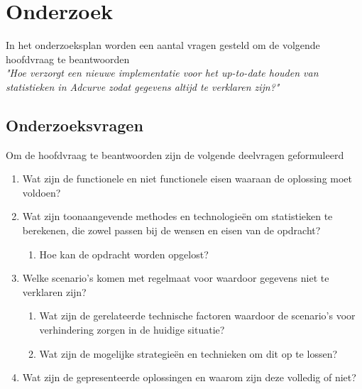 \chapter{Onderzoek}

In het onderzoeksplan worden een aantal vragen gesteld om de volgende hoofdvraag te beantwoorden \\

{\large \textit{"Hoe verzorgt een nieuwe implementatie voor het up-to-date houden van statistieken in Adcurve zodat gegevens altijd te verklaren zijn?"}} \\

\section{Onderzoeksvragen}

Om de hoofdvraag te beantwoorden zijn de volgende deelvragen geformuleerd

\begin{enumerate}
\item Wat zijn de functionele en niet functionele eisen waaraan de oplossing moet voldoen?
\item Wat zijn toonaangevende methodes en technologieën om statistieken te berekenen, die zowel passen bij de wensen en eisen van de opdracht?
\begin{enumerate}
    \item Hoe kan de opdracht worden opgelost?
\end{enumerate}
\item Welke scenario's komen met regelmaat voor waardoor gegevens niet te verklaren zijn?
\begin{enumerate}
    \item Wat zijn de gerelateerde technische factoren waardoor de scenario's voor verhindering zorgen in de huidige situatie?
    \item Wat zijn de mogelijke strategieën en technieken om dit op te lossen?
\end{enumerate}

\item Wat zijn de gepresenteerde oplossingen en waarom zijn deze volledig of niet?
\end{enumerate}

